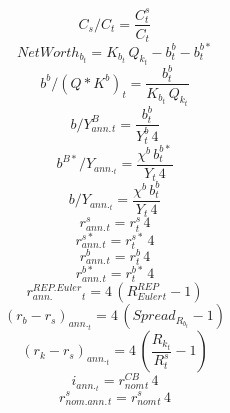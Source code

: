 \begin{dmath}
{ C_s / C  _{t}}=\frac{{C^s_{t}}}{{C_{t}}}
\end{dmath}
\begin{dmath}
{ NetWorth_b _{t}}={K_b_{t}}\, { Q_k _{t}}-{b^b_{t}}-{b^{b*}_{t}}
\end{dmath}
\begin{dmath}
{ b^b / (Q * K^b) _{t}}=\frac{{b^b_{t}}}{{K_b_{t}}\, { Q_k _{t}}}
\end{dmath}
\begin{dmath}
{ b / Y^B_{ann.} _{t}}=\frac{{b^b_{t}}}{{Y^b_{t}}\, 4}
\end{dmath}
\begin{dmath}
{ b^{B*}/ Y_{ann.} _{t}}=\frac{{\chi^b }\, {b^{b*}_{t}}}{{Y_{t}}\, 4}
\end{dmath}
\begin{dmath}
{b/ Y_{ann.} _{t}}=\frac{{\chi^b }\, {b^b_{t}}}{{Y_{t}}\, 4}
\end{dmath}
\begin{dmath}
{r^s_{ann.}_{t}}={r^s_{t}}\, 4
\end{dmath}
\begin{dmath}
{r^{s*}_{ann.}_{t}}={r^{s*}_{t}}\, 4
\end{dmath}
\begin{dmath}
{r^b_{ann.}_{t}}={r^b_{t}}\, 4
\end{dmath}
\begin{dmath}
{r^{b*}_{ann.}_{t}}={r^{b*}_{t}}\, 4
\end{dmath}
\begin{dmath}
{ r^{REP.Euler}_{ann.} _{t}}=4\, \left({ R^{REP}_{Euler} _{t}}-1\right)
\end{dmath}
\begin{dmath}
{ (r_b - r_s)_{ann.} _{t}}=4\, \left({Spread_R_b_{t}}-1\right)
\end{dmath}
\begin{dmath}
{ (r_k - r_s)_{ann.} _{t}}=4\, \left(\frac{{ R_k _{t}}}{{R^s_{t}}}-1\right)
\end{dmath}
\begin{dmath}
{ i_{ann.}_{t}}={ r^{CB}_{nom}_{t}}\, 4
\end{dmath}
\begin{dmath}
{ r^s_{nom.ann.}_{t}}={ r^s_{nom}_{t}}\, 4
\end{dmath}

